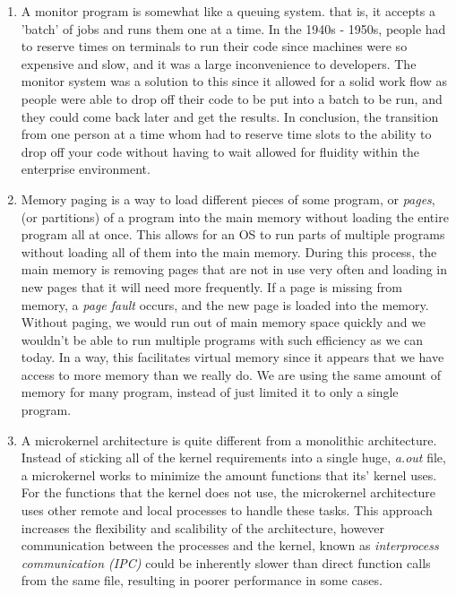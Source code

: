 \documentclass[12pt]{article}
\begin{document}
\begin{enumerate}
	\item A monitor program is somewhat like a queuing system. that is, it accepts a 			'batch' of jobs and runs them one at a time. In the 1940s - 1950s, people had to 			reserve times on terminals to run their code since machines were so expensive and 			slow, and it was a large inconvenience to developers. The monitor system was a 				solution to this since it allowed for a solid work flow as people were able to drop 		off their code to be put into a batch to be run, and they could come back later and 		get the results. In conclusion, the 	transition from one person at a time whom had 		to reserve time slots to the ability to drop 	off your code without having to wait 		allowed for fluidity within the enterprise environment.

	\item Memory paging is a way to load different pieces of some program, or \textit{pages}, (or partitions) of a program into the main memory without loading the entire program all at once.	This allows for an OS to run parts of multiple programs without loading all of them into the main memory. During this process, the main memory is removing pages that are not in use very often and loading in new pages that it will need more frequently. If a page is missing from memory, a \textit{page fault} occurs, and the new page is loaded into the memory. Without paging, we would run out of main memory space quickly and we wouldn't be able to run multiple programs with such efficiency as we can today. In a way, this facilitates virtual memory since it appears that we have access to more memory than we really do. We are using the same amount of memory for many program, instead of just limited it to only a single program.

	\item A microkernel architecture is quite different from a monolithic architecture. Instead of sticking all of the kernel requirements into a single huge, \textit{a.out} file, a microkernel works to minimize the amount functions that its' kernel uses. For the functions that the kernel does not use, the microkernel architecture uses other remote and local processes to handle these tasks. This approach increases the flexibility and scalibility of the architecture, however communication between the processes and the kernel, known as \textit{interprocess communication (IPC)} could be inherently slower than direct function calls from the same file, resulting in poorer performance in some cases.

\end{enumerate}
	
\end{document}
